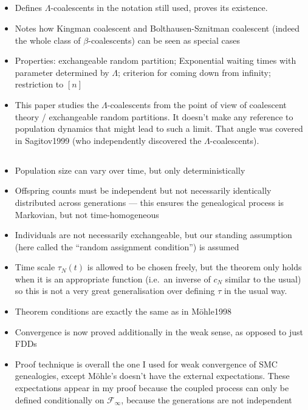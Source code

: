 \documentclass{article}
\begin{document}
\subsection*{\cite{pitman1999}}
\begin{itemize}
\item Defines $\Lambda$-coalescents in the notation still used, proves its existence.
\item Notes how Kingman coalescent and Bolthausen-Sznitman coalescent (indeed the whole class of $\beta$-coalescents) can be seen as special cases
\item Properties: exchangeable random partition; Exponential waiting times with parameter determined by $\Lambda$; criterion for coming down from infinity; restriction to $[n]$
\item This paper studies the $\Lambda$-coalescents from the point of view of coalescent theory / exchangeable random partitions. It doesn't make any reference to population dynamics that might lead to such a limit. That angle was covered in Sagitov1999 (who independently discovered the $\Lambda$-coalescents).
\end{itemize}


\subsection*{\cite{mohle1999}}
\begin{itemize}
\item Population size can vary over time, but only deterministically
\item Offspring counts must be independent but not necessarily identically distributed across generations --- this ensures the genealogical process is Markovian, but not time-homogeneous
\item Individuals are not necessarily exchangeable, but our standing assumption (here called the ``random assignment condition'') is assumed
\item Time scale $\tau_N(t)$ is allowed to be chosen freely, but the theorem only holds when it is an appropriate function (i.e.\ an inverse of $c_N$ similar to the usual) so this is not a very great generalisation over defining $\tau$ in the usual way.
\item Theorem conditions are exactly the same as in M\"ohle1998
\item Convergence is now proved additionally in the weak sense, as opposed to just FDDs
\item Proof technique is overall the one I used for weak convergence of SMC genealogies, except M\"ohle's doesn't have the external expectations. These expectations appear in my proof because the coupled process can only be defined conditionally on $\mathcal{F}_\infty$, because the generations are not independent
\end{itemize}
\end{document}
